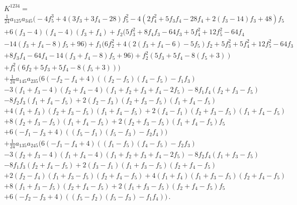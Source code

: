 \documentclass[12pt,a4paper]{article}
\numberwithin{equation}{section}
\newcommand{\bea}{\begin{eqnarray}}
\newcommand{\eea}{\end{eqnarray}}
\begin{document}
 {\small
 \bea
&&K^{1234}=  \nonumber \\
   && \frac{1}{24} a_{125} a_{345} \Big(-4 f_5^3+4 (3 f_3+3 f_4-28) f_5^2-4 (2 f_4^2+5
   f_3 f_4-28 f_4+2 (f_3-14) f_3+48) f_5 \nonumber\\
   &&+6 (f_3-4) (f_4-4)
   (f_3+f_4)+f_2 (5 f_3^2+8 f_4 f_3-64 f_3+5 f_4^2+12 f_5^2-64 f_4 \nonumber\\
   &&-14
   (f_3+f_4-8) f_5+96)+f_1 (6 f_2^2+4 (2 (f_3+f_4-6)-5
   f_5) f_2+5 f_3^2+5 f_4^2+12 f_5^2-64 f_3 \nonumber\\
   &&+8 f_3 f_4-64 f_4-14 (f_3+f_4-8)
   f_5+96)+f_2^2 (5 f_3+5 f_4-8 (f_5+3)) \nonumber\\
   &&+f_1^2 (6 f_2+5 f_3+5
   f_4-8 (f_5+3))\Big) \nonumber\\
   &&+\frac{1}{24} a_{145} a_{235} \Big(6
   (-f_2-f_4+4) ((f_2-f_5) (f_4-f_5)-f_1 f_3) \nonumber\\
   &&-3
   (f_1+f_3-4) (f_2+f_4-4) (f_1+f_2+f_3+f_4-2 f_5)-8 f_1 f_4
   (f_2+f_3-f_5) \nonumber\\
   &&-8 f_2 f_3 (f_1+f_4-f_5)+2 (f_2-f_3)
   (f_2+f_3-f_5) (f_1+f_4-f_5) \nonumber\\
   &&+4 (f_1+f_3)
   (f_2+f_3-f_5) (f_1+f_4-f_5)+2 (f_4-f_1)
   (f_2+f_3-f_5) (f_1+f_4-f_5) \nonumber\\
   &&+8 (f_2+f_3-f_5)
   (f_1+f_4-f_5)+2 (f_2+f_3-f_5) (f_1+f_4-f_5) f_5 \nonumber\\
   &&+6
   (-f_1-f_3+4) ((f_5-f_1) (f_5-f_3)-f_2
   f_4)\Big) \nonumber\\
   &&+\frac{1}{24} a_{135} a_{245} \Big(6 (-f_1-f_4+4)
   ((f_1-f_5) (f_4-f_5)-f_2 f_3) \nonumber\\
   &&-3 (f_2+f_3-4)
   (f_1+f_4-4) (f_1+f_2+f_3+f_4-2 f_5)-8 f_2 f_4 (f_1+f_3-f_5) \nonumber\\
   &&-8
   f_1 f_3 (f_2+f_4-f_5)+2 (f_3-f_1) (f_1+f_3-f_5)
   (f_2+f_4-f_5) \nonumber\\
   &&+2 (f_2-f_4) (f_1+f_3-f_5)
   (f_2+f_4-f_5)+4 (f_1+f_4) (f_1+f_3-f_5)
   (f_2+f_4-f_5) \nonumber\\
   &&+8 (f_1+f_3-f_5) (f_2+f_4-f_5)+2
   (f_1+f_3-f_5) (f_2+f_4-f_5) f_5 \nonumber\\
   &&+6 (-f_2-f_3+4)
   ((f_5-f_2) (f_5-f_3)-f_1 f_4)\Big)\,.
 \eea
 }
 
\end{document}
